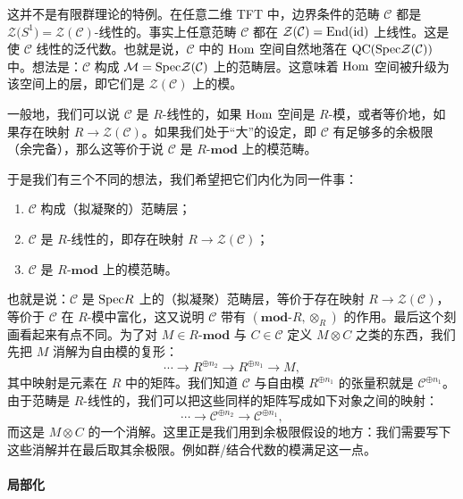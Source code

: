 这并不是有限群理论的特例。在任意二维 TFT 中，边界条件的范畴 $\mathcal{C}$ 都是 $\mathcal{Z}\big(S^1\big)=\mathcal{Z}(\mathcal{C})$-线性的。事实上任意范畴 $\mathcal{C}$ 都在 $\mathcal{Z}(\mathcal{C})=\mathrm{End}(\mathrm{id})$ 上线性。这是使 $\mathcal{C}$ 线性的泛代数。也就是说，$\mathcal{C}$ 中的 $\mathrm{Hom}$ 空间自然地落在 $\mathrm{QC}(\mathrm{Spec}\mathcal{Z}(\mathcal{C}))$ 中。想法是：$\mathcal{C}$ 构成 $\mathcal{M}=\mathrm{Spec}\mathcal{Z}(\mathcal{C})$ 上的范畴层。这意味着 $\mathrm{Hom}$ 空间被升级为该空间上的层，即它们是 $\mathcal{Z}(\mathcal{C})$ 上的模。

一般地，我们可以说 $\mathcal{C}$ 是 $R$-线性的，如果 $\mathrm{Hom}$ 空间是 $R$-模，或者等价地，如果存在映射 $R\to\mathcal{Z}(\mathcal{C})$。如果我们处于“大”的设定，即 $\mathcal{C}$ 有足够多的余极限（余完备），那么这等价于说 $\mathcal{C}$ 是 $R\text{-}\mathbf{mod}$ 上的模范畴。

于是我们有三个不同的想法，我们希望把它们内化为同一件事：
\begin{enumerate}
\item $\mathcal{C}$ 构成（拟凝聚的）范畴层；
\item $\mathcal{C}$ 是 $R$-线性的，即存在映射 $R\to\mathcal{Z}(\mathcal{C})$；
\item $\mathcal{C}$ 是 $R\text{-}\mathbf{mod}$ 上的模范畴。
\end{enumerate}
也就是说：$\mathcal{C}$ 是 $\mathrm{Spec} R$ 上的（拟凝聚）范畴层，等价于存在映射 $R\to\mathcal{Z}(\mathcal{C})$，等价于 $\mathcal{C}$ 在 $R$-模中富化，这又说明 $\mathcal{C}$ 带有 $(\mathbf{mod}\text{-}R,\otimes_R)$ 的作用。最后这个刻画看起来有点不同。为了对 $M\in R\text{-}\mathbf{mod}$ 与 $C\in\mathcal{C}$ 定义 $M\otimes C$ 之类的东西，我们先把 $M$ 消解为自由模的复形：
\begin{equation}\tag{10.129}
\cdots\longrightarrow R^{\oplus n_2}\longrightarrow R^{\oplus n_1}\longrightarrow M,
\end{equation}
其中映射是元素在 $R$ 中的矩阵。我们知道 $\mathcal{C}$ 与自由模 $R^{\oplus n_1}$ 的张量积就是 $\mathcal{C}^{\oplus n_1}$。由于范畴是 $R$-线性的，我们可以把这些同样的矩阵写成如下对象之间的映射：
\begin{equation}\tag{10.130}
\cdots\longrightarrow \mathcal{C}^{\oplus n_2}\longrightarrow \mathcal{C}^{\oplus n_1},
\end{equation}
而这是 $M\otimes C$ 的一个消解。这里正是我们用到余极限假设的地方：我们需要写下这些消解并在最后取其余极限。例如群/结合代数的模满足这一点。

\paragraph{局部化}

